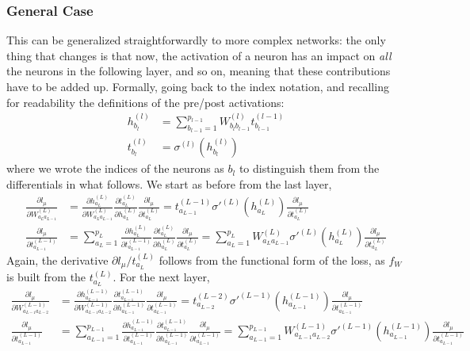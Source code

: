\documentclass{article}
\begin{document}
\subsubsection*{General Case}
This can be generalized straightforwardly to more complex networks: the only thing that changes is that now, the activation of a neuron has an impact on \emph{all} the neurons in the following layer, and so on, meaning that these contributions have to be added up. Formally, going back to the index notation, and recalling for readability the definitions of the pre/post activations:
\begin{align}
    h^{(l)}_{b_{l}} &=
    \sum_{b_{l-1}=1}^{p_{l-1}} W^{(l)}_{b_{l}b_{l-1}} t^{(l-1)}_{b_{l-1}} \\
    t^{(l)}_{b_{l}} &=
    \sigma^{(l)}(h^{(l)}_{b_{l}})
\end{align}
where we wrote the indices of the neurons as $b_l$ to distinguish them from the differentials in what follows. We start as before from the last layer,
\begin{align}
    \frac{\partial l_{\mu}}{\partial W^{(L)}_{a_L a_{L-1}}}
    &=
    \frac{\partial h^{(L)}_{a_L}}{\partial W^{(L)}_{a_L a_{L-1}}}
    \frac{\partial t^{(L)}_{a_L}}{\partial h^{(L)}_{a_L}}
    \frac{\partial l_{\mu}}{\partial t^{(L)}_{a_L}}
    = t^{(L-1)}_{a_{L-1}} \sigma'^{(L)} (h^{(L)}_{a_L})
    \frac{\partial l_{\mu}}{\partial t^{(L)}_{a_L}}
     \\
    \frac{\partial l_{\mu}}{\partial t^{(L-1)}_{a_{L-1}}}
    &=
    \sum_{a_L=1}^{p_L}
    \frac{\partial h^{(L)}_{a_L}}{\partial t^{(L-1)}_{a_{L-1}}}
    \frac{\partial t^{(L)}_{a_L}}{\partial h^{(L)}_{a_L}}
    \frac{\partial l_{\mu}}{\partial t^{(L)}_{a_L}}
    =
    \sum_{a_L=1}^{p_L}
    W^{(L)}_{a_{L}a_{L-1}}
    \sigma'^{(L)} (h^{(L)}_{a_L})
    \frac{\partial l_{\mu}}{\partial t^{(L)}_{a_L}}
\end{align}
Again, the derivative $\partial l_{\mu} / t^{(L)}_{a_L}$ follows from the functional form of the loss, as $f_W$ is built from the $t^{(L)}_{a_L}$. For the next layer,
\begin{align}
    \frac{\partial l_{\mu}}{\partial W^{(L-1)}_{a_{L-1} a_{L-2}}}
    &=
    \frac{\partial h^{(L-1)}_{a_{L-1}}}{\partial W^{(L-1)}_{a_{L-1} a_{L-2}}}
    \frac{\partial t^{(L-1)}_{a_{L-1}}}{\partial h^{(L-1)}_{a_{L-1}}}
    \frac{\partial l_{\mu}}{\partial t^{(L-1)}_{a_{L-1}}}
    = t^{(L-2)}_{a_{L-2}} \sigma'^{(L-1)} (h^{(L-1)}_{a_{L-1}})
    \frac{\partial l_{\mu}}{\partial t^{(L-1)}_{a_{L-1}}}
     \\
    \frac{\partial l_{\mu}}{\partial t^{(L-1)}_{a_{L-1}}}
    &=
    \sum_{a_{L-1}=1}^{p_{L-1}}
    \frac{\partial h^{(L-1)}_{a_{L-1}}}{\partial t^{(L-1)}_{a_{L-1}}}
    \frac{\partial t^{(L-1)}_{a_{L-1}}}{\partial h^{(L-1)}_{a_{L-1}}}
    \frac{\partial l_{\mu}}{\partial t^{(L-1)}_{a_{L-1}}}
    =
    \sum_{a_{L-1}=1}^{p_{L-1}}
    W^{(L-1)}_{a_{L-1}a_{L-2}}
    \sigma'^{(L-1)} (h^{(L-1)}_{a_{L-1}})
    \frac{\partial l_{\mu}}{\partial t^{(L-1)}_{a_{L-1}}}
\end{align}
\end{document}
